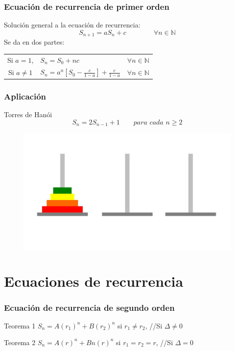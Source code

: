 \begin{frame}
	\frametitle{Ecuación de recurrencia de primer orden}
	\begin{block}{}
		Solución general a la ecuación de recurrencia:
		$$S_{n+1} = aS_n + c \qquad \qquad \forall n \in \mathds{N}$$
		Se da en dos partes:
		\begin{tabular}{cll}
			Si $a=1$, & $S_n = S_0 + nc$ & $\forall n \in \mathds{N}$\\
			Si $a\neq 1$& $S_n = a^n [S_0 - \frac{c}{1-a}] + \frac{c}{1-a}$  &$\forall n \in \mathds{N} $
		\end{tabular}
	\end{block}
\end{frame}

\begin{frame}
	\frametitle{Aplicación}
	\begin{block}{Torres de Hanói}
		$$S_n = 2S_{n-1} + 1   \qquad \textit{para cada $n \geq 2$}$$
	\end{block}
	
	\begin{block}{}
		\begin{figure}
			\centering
			\includegraphics[scale=0.15]{torre.jpg}
		\end{figure}
	\end{block}
\end{frame}

\section{Ecuaciones de recurrencia}

\begin{frame}
	\frametitle{Ecuación de recurrencia de segundo orden}
	\begin{block}{Teorema 1}
		$S_n = A(r_1)^n + B(r_2)^n$ si $r_1 \neq r_2$, \;\;\;\;\;\;\;\;\;\;\; //Si $\Delta \neq 0$
		
	\end{block}
	\begin{block}{Teorema 2}
		$S_n = A(r)^n + Bn(r)^n$ si $r_1 = r_2 = r$, \;\;\;\;\;\;\;\;\;\;\; //Si $\Delta = 0$
		
	\end{block}
\end{frame}


